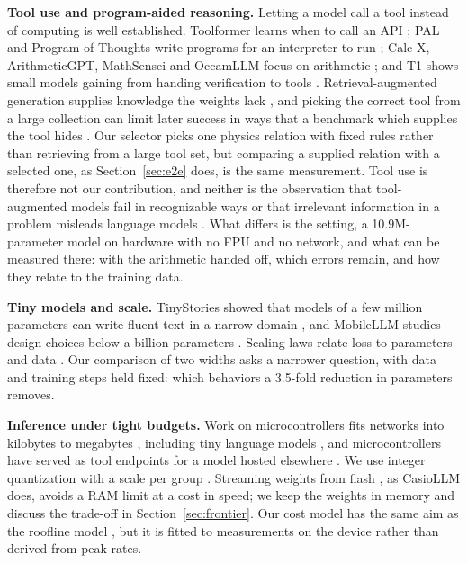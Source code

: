 \documentclass[10pt]{article}
\begin{document}
\textbf{Tool use and program-aided reasoning.} Letting a model call a tool instead of computing is
well established. Toolformer learns when to call an API \citep{schick2023toolformer}; PAL and
Program of Thoughts write programs for an interpreter to run \citep{gao2022program,chen2022program};
Calc-X, ArithmeticGPT, MathSensei and OccamLLM focus on arithmetic
\citep{kadlcik2023calcx,liu2025arithmeticgpt,das2024mathsensei,dugan2024occamllm}; and T1 shows small
models gaining from handing verification to tools \citep{kang2025tool}. Retrieval-augmented
generation supplies knowledge the weights lack \citep{lewis2020retrieval}, and picking the correct tool
from a large collection can limit later success in ways that a benchmark which supplies the tool hides
\citep{shi2025retrieval}. Our selector picks one physics relation with fixed rules rather than
retrieving from a large tool set, but comparing a supplied relation with a selected one, as
Section~\ref{sec:e2e} does, is the same measurement. Tool use is therefore not our contribution, and
neither is the observation that tool-augmented models fail in recognizable ways
\citep{trevino2025benchmarking} or that irrelevant information in a problem misleads language models
\citep{shi2023large}. What differs is the setting, a 10.9M-parameter model on hardware with no FPU
and no network, and what can be measured there: with the arithmetic handed off, which errors remain,
and how they relate to the training data.

\textbf{Tiny models and scale.} TinyStories showed that models of a few million parameters can
write fluent text in a narrow domain \citep{eldan2023tinystories}, and MobileLLM studies design
choices below a billion parameters \citep{liu2024mobilellm}. Scaling laws relate loss to parameters
and data \citep{kaplan2020scaling,hoffmann2022training}. Our comparison of two widths asks a narrower
question, with data and training steps held fixed: which behaviors a 3.5-fold reduction in parameters
removes.

\textbf{Inference under tight budgets.} Work on microcontrollers fits networks into kilobytes to
megabytes \citep{lin2020mcunet,lai2018cmsis}, including tiny language models
\citep{scherer2024deeploy,yang2024mcubert}, and microcontrollers have served as tool endpoints for a
model hosted elsewhere \citep{yang2026device}. We use integer quantization with a scale per group
\citep{jacob2017quantization,dettmers2022matrix}. Streaming weights from flash
\citep{alizadeh2023flash}, as CasioLLM does, avoids a RAM limit at a cost in speed; we keep the
weights in memory and discuss the trade-off in Section~\ref{sec:frontier}. Our cost model has the
same aim as the roofline model \citep{williams2009roofline}, but it is fitted to measurements on the
device rather than derived from peak rates.
\end{document}
